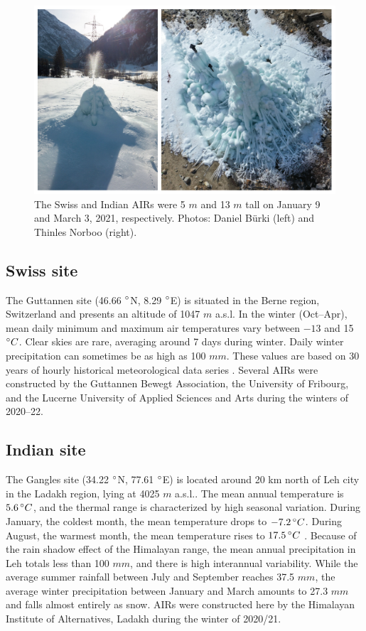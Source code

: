 \begin{figure}[htb]
	\centering
	\includegraphics[width=12 cm]{figs/2AIRs.jpg}
	\caption{The Swiss and Indian \ac{AIRs} were 5 $m$ and 13 $m$ tall on January 9 and March 3, 2021,
    respectively. Photos: Daniel Bürki (left) and Thinles Norboo (right).}
	\label{fig:2AIRs}
\end{figure}

\subsection{Swiss site}

The Guttannen site (46.66 $^{\circ}$N, 8.29 $^{\circ}$E) is situated in the Berne region, Switzerland and presents
an altitude of 1047 $m$ a.s.l. In the winter (Oct–Apr), mean daily minimum and maximum air temperatures vary
between $-13$ and 15 $^{\circ} C$. Clear skies are rare, averaging around 7 days during winter. Daily winter
precipitation can sometimes be as high as 100 $mm$. These values are based on 30 years of hourly historical
meteorological data series \citep{meteoblueClimateGuttannen2021}. Several \ac{AIRs} were constructed by the
Guttannen Bewegt Association, the University of Fribourg, and the Lucerne University of Applied Sciences and
Arts during the winters of 2020–22.

\subsection{Indian site}

The Gangles site (34.22 $^{\circ}$N, 77.61 $^{\circ}$E) is located around 20 km north of Leh city in the Ladakh
region, lying at 4025 $m$ a.s.l.. The mean annual temperature is $5.6 \, ^{\circ} C$, and the thermal range is
characterized by high seasonal variation. During January, the coldest month, the mean temperature drops to $-7.2
\, ^{\circ} C$. During August, the warmest month, the mean temperature rises to $17.5 \, ^{\circ} C$
\citep{nusserIrrigationDevelopmentUpper2012}. Because of the rain shadow effect of the Himalayan range, the mean
annual precipitation in Leh totals less than 100 $mm$, and there is high interannual variability. While the
average summer rainfall between July and September reaches 37.5 $mm$, the average winter precipitation between
January and March amounts to 27.3 $ mm$ and falls almost entirely as snow. \ac{AIRs} were constructed here by
the Himalayan Institute of Alternatives, Ladakh during the winter of 2020/21.


